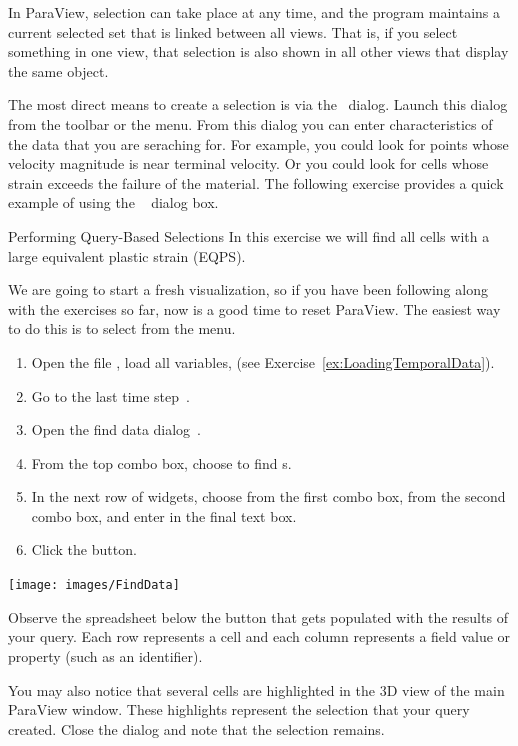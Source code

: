 In ParaView, selection can take place at any time, and the program
maintains a current selected set that is linked between all views.
That is, if you select something in one view, that selection is also
shown in all other views that display the same object.

The most direct means to create a selection is via the ~\findData dialog. Launch this dialog from the toolbar or the
 menu.  From this dialog you can enter characteristics of the
data that you are seraching for.  For example, you could look for points
whose velocity magnitude is near terminal velocity.  Or you could look for
cells whose strain exceeds the failure of the material.  The following
exercise provides a quick example of using the ~\findData
dialog box.

\begin{exercise}{Performing Query-Based Selections}
  \label{ex:PerformingQueryBasedSelections}%
  In this exercise we will find all cells with a large equivalent plastic
  strain (EQPS).

  We are going to start a fresh visualization, so if you have been
  following along with the exercises so far, now is a good time to reset
  ParaView.  The easiest way to do this is to select  \ra
   from the menu.

  \begin{enumerate}
  \item Open the file , load all variables, \apply (see
    Exercise~\ref{ex:LoadingTemporalData}).
  \item Go to the last time step~\vcrLast.
  \item Open the find data dialog~\findData.
  \item From the top combo box, choose to find s.
  \item In the next row of widgets, choose  from the first combo
    box,  from the second combo box, and enter  in the
    final text box.
  \item Click the  button.
  \end{enumerate}

  \begin{inlinefig}
    \texttt{[image: images/FindData]}
  \end{inlinefig}

  Observe the spreadsheet below the  button that
  gets populated with the results of your query.  Each row represents a
  cell and each column represents a field value or property (such as an
  identifier).

  You may also notice that several cells are highlighted in the 3D view of
  the main ParaView window.  These highlights represent the selection that
  your query created.  Close the  dialog and note that the
  selection remains.
\end{exercise}

